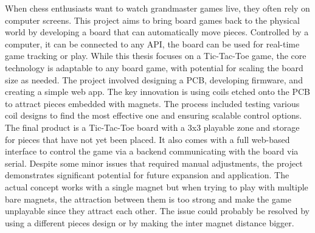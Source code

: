 \begin{spacing}{0.956}
	\vspace{0.5cm}

	When chess enthusiasts want to watch grandmaster games live, they often rely on computer screens. This project aims to bring board games back to the physical world by developing a board that can automatically move pieces. Controlled by a computer, it can be connected to any API, the board can be used for real-time game tracking or play. While this thesis focuses on a Tic-Tac-Toe game, the core technology is adaptable to any board game, with potential for scaling the board size as needed.
	The project involved designing a PCB, developing firmware, and creating a simple web app. The key innovation is using coils etched onto the PCB to attract pieces embedded with magnets. The process included testing various coil designs to find the most effective one and ensuring scalable control options. The final product is a Tic-Tac-Toe board with a 3x3 playable zone  and storage for pieces that have not yet been placed. It also comes with a full web-based interface to control the game via a backend communicating with the board via serial. Despite some minor issues that required manual adjustments, the project demonstrates significant potential for future expansion and application. The actual concept works with a single magnet but when trying to play with multiple bare magnets, the attraction between them is too strong and make the game unplayable since they attract each other. The issue could probably be resolved by using a different pieces design or by making the inter magnet distance bigger.


\end{spacing}
